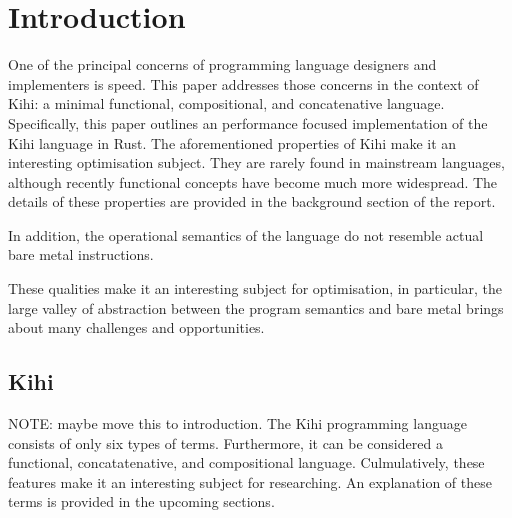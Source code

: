 \chapter{Introduction} \label{C:intro}
One of the principal concerns of programming language designers
and implementers is speed. This paper addresses those concerns
in the context of Kihi: a minimal functional, compositional,
and concatenative language. Specifically, this paper outlines
an performance focused implementation of the Kihi language in
Rust. The aforementioned properties of Kihi make it an interesting
optimisation subject. They are rarely found in mainstream languages,
although recently functional concepts have become much more widespread.
The details of these properties are provided in the background
section of the report.

In addition, the operational semantics of the language do not
resemble actual bare metal instructions.



These qualities make it an 
interesting subject for optimisation, in particular, the large
valley of abstraction between the program semantics and bare
metal brings about many challenges and opportunities.




\section{Kihi}
NOTE: maybe move this to introduction.
The Kihi programming language consists of only six types of terms.
Furthermore, it can be considered a functional, concatatenative,
and compositional language. Culmulatively, these features make it
an interesting subject for researching. An explanation of these
terms is provided in the upcoming sections. 